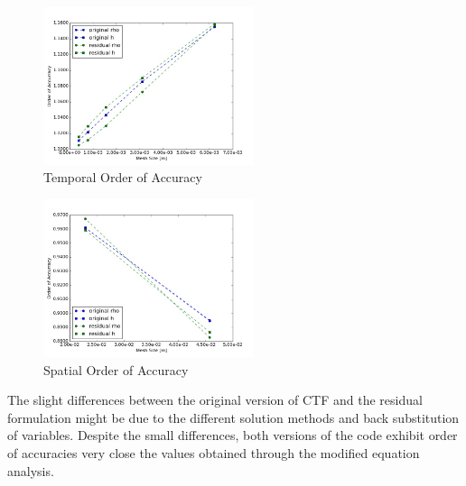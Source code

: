 \documentclass{mc2015}
\begin{document}
\begin{figure}[!h]
	\centering
	\includegraphics[width=0.55\textwidth]{images/Temporal_Study/Order_Of_Accuracy_Summary}
	\caption{Temporal Order of Accuracy}
	\label{fig:Temporal:OOA}
\end{figure}

\begin{figure}[!h]
	\centering
	\includegraphics[width=0.55\textwidth]{images/Spatial_Study/Order_Of_Accuracy_Summary}
	\caption{Spatial Order of Accuracy}
	\label{fig:Spatial:OOA}
\end{figure}

The slight differences between the original version of CTF and the residual
formulation might be due to the different solution methods and back substitution
of variables. Despite the small differences, both versions of the code exhibit
order of accuracies very close the values obtained through the modified
equation analysis.
\end{document}
